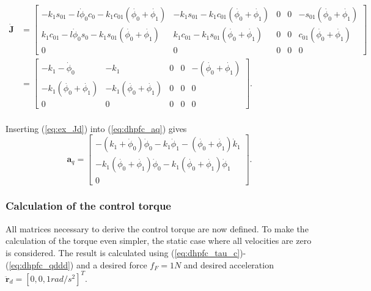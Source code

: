 \begin{equation}\label{eq:ex_Jd}
    \begin{split}
        \mathbf{\dot{J}}&=
        \begin{bmatrix}
            - k_1 s_{01} -l \dot{\phi}_0c_0 -k_1 c_{01}(\dot{\phi_0}+\dot{\phi_1}) & -k_1 s_{01}-k_1 c_{01}(\dot{\phi_0}+\dot{\phi_1}) & 0 & 0 & -s_{01}(\dot{\phi_0}+\dot{\phi_1}) \\
            k_1 c_{01} -l \dot{\phi}_0s_0 -k_1 s_{01}(\dot{\phi_0}+\dot{\phi_1}) & k_1 c_{01}-k_1 s_{01}(\dot{\phi_0}+\dot{\phi_1}) & 0 & 0 & c_{01}(\dot{\phi_0}+\dot{\phi_1}) \\
            0 & 0 & 0 & 0 & 0
        \end{bmatrix}\\&=
        \begin{bmatrix}
            - k_1 -\dot{\phi}_0 & -k_1 & 0 & 0 & -(\dot{\phi_0}+\dot{\phi_1}) \\
            -k_1(\dot{\phi_0}+\dot{\phi_1}) & -k_1(\dot{\phi_0}+\dot{\phi_1}) & 0 & 0 & 0\\
            0 & 0 & 0 & 0 & 0
        \end{bmatrix}.
    \end{split}
\end{equation}
\\
Inserting (\ref{eq:ex_Jd}) into (\ref{eq:dhpfc_aq}) gives
\begin{equation}
    \mathbf{a}_q =
    \begin{bmatrix}
            - (k_1 +\dot{\phi}_0)\dot{\phi}_0 -k_1 \dot{\phi}_1 -(\dot{\phi_0}+\dot{\phi_1})\dot{k}_1 \\
            -k_1(\dot{\phi_0}+\dot{\phi_1})\dot{\phi}_0 -k_1(\dot{\phi_0}+\dot{\phi_1})\dot{\phi}_1 \\
            0
        \end{bmatrix}.
\end{equation}

\subsubsection{Calculation of the control torque}

All matrices necessary to derive the control torque are now defined. To make the calculation of the torque even simpler, the static case where all velocities are zero is considered. The result is calculated using (\ref{eq:dhpfc_tau_c})-(\ref{eq:dhpfc_qddd}) and a desired force $f_F = 1 N$ and desired acceleration $\ddot{\mathbf{r}}_d = [0, 0, 1 rad/s^2]^T$.

